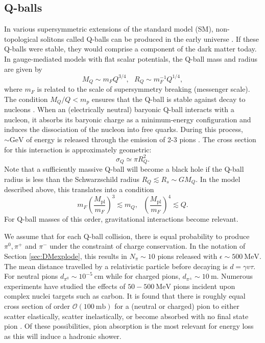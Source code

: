 \documentclass[twocolumn,showpacs,preprintnumbers,amsmath,amssymb,prd]{revtex4}
\newcommand{\OO}{\mathcal{O}}
\newcommand{\Mpl}{M_{\text{pl}}}
\def\r{\right)}
\def\l{\left(}
\begin{document}
\subsection{Q-balls}
\label{sec:Qballs}
In various supersymmetric extensions of the standard model (SM), non-topological solitons called Q-balls can be produced in the early universe \cite{Coleman:1985ki, Kusenko:1997si}. If these Q-balls were stable, they would comprise a component of the dark matter today. In gauge-mediated models with flat scalar potentials, the Q-ball mass and radius are given by
\begin{equation}
\label{eq:Qballprop}
M_Q \sim m_F Q^{3/4}, ~~~ R_Q \sim m_F^{-1} Q^{1/4},
\end{equation}
where $m_F$ is related to the scale of supersymmetry breaking (messenger scale). The condition $M_Q/Q < m_p$ ensures that the Q-ball is stable against decay to nucleons \cite{Dine:2003ax}. When an (electrically neutral) baryonic Q-ball interacts with a nucleon, it absorbs its baryonic charge as a minimum-energy configuration and induces the dissociation of the nucleon into free quarks. During this process, $\sim \text{GeV}$ of energy is released through the emission of 2-3 pions \cite{Dine:2003ax}. The cross section for this interaction is approximately geometric:
\begin{equation}
\sigma_Q \simeq \pi R_Q^2.
\end{equation}
Note that a sufficiently massive Q-ball will become a black hole if the Q-ball radius is less than the Schwarzschild radius $R_Q \lesssim R_s \sim G M_Q$. In the model described above, this translates into a condition
\begin{equation}
m_F \l\frac{\Mpl}{m_F}\r^3 \lesssim m_Q, ~~~ \l\frac{\Mpl}{m_F}\r^4 \lesssim Q.
\end{equation}
For Q-ball masses of this order, gravitational interactions become relevant.

We assume that for each Q-ball collision, there is equal probability to produce $\pi^0, \pi^+$ and $\pi^-$ under the constraint of charge conservation. In the notation of Section \ref{sec:DMexplode}, this results in $N_{\pi} \sim 10$ pions released with $\epsilon \sim 500 ~\text{MeV}$. The mean distance travelled by a relativistic particle before decaying is $d = \gamma v \tau$. For neutral pions $d_{\pi^0} \sim 10^{-5} ~\text{cm}$ while for charged pions, $d_{\pi^\pm} \sim 10 ~\text{m}$. Numerous experiments have studied the effects of $50 - 500 ~\text{MeV}$ pions incident upon complex nuclei targets such as carbon. It is found that there is roughly equal cross section of order $\OO (100 ~\text{mb})$ for a (neutral or charged) pion to either scatter elastically, scatter inelastically, or become absorbed with no final state pion \cite{Pionnuclear}. Of these possibilities, pion absorption is the most relevant for energy loss as this will induce a hadronic shower.
\end{document}
